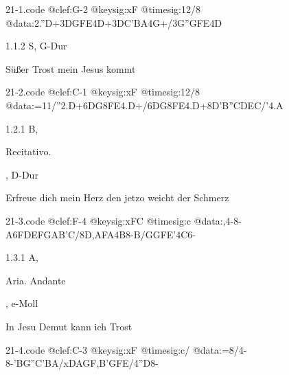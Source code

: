 \documentclass[a4paper, twocolumn, 11pt]{book}
\begin{document}
\begin{filecontents*}{21-1.code}
@clef:G-2
@keysig:xF
@timesig:12/8
@data:2.''D+{3DGFE}4D+{3DC'BA}4G+/{3G''GFE}4D
\end{filecontents*}
\newline %
\par 1.1.2  S, G-Dur\newline \begin{footnotesize} Süßer Trost mein Jesus kommt \end{footnotesize}  
\begin{filecontents*}{21-2.code}
@clef:C-1
@keysig:xF
@timesig:12/8
@data:=11/''2.D+{6DG8F}E4.D+/{6DG8F}E4.D+8D'B''C{DE}C/'4.A
\end{filecontents*}
\newline %
\par 1.2.1  B, \begin{itshape}Recitativo.\end{itshape}, D-Dur\newline \begin{footnotesize} Erfreue dich mein Herz den jetzo weicht der Schmerz \end{footnotesize}  
\begin{filecontents*}{21-3.code}
@clef:F-4
@keysig:xFC
@timesig:c
@data:,4-8-A{6FDEFGAB'C}/8D,AFA4B8-B/GGFE'4C6-
\end{filecontents*}
\newline %
\par 1.3.1  A, \begin{itshape}Aria. Andante\end{itshape}, e-Moll\newline \begin{footnotesize} In Jesu Demut kann ich Trost \end{footnotesize}  
\begin{filecontents*}{21-4.code}
@clef:C-3
@keysig:xF
@timesig:c/
@data:=8/4-8-'B{G''C}{'BA}/{xDA}{GF}{,B'G}{FE}/4''D8-
\end{filecontents*}
\end{document}

